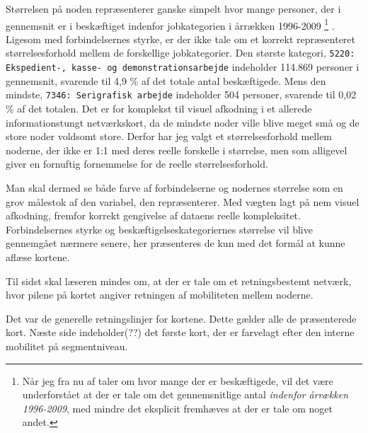 Størrelsen på noden repræsenterer ganske simpelt hvor mange personer, der i gennemsnit er i beskæftiget indenfor jobkategorien i årrækken 1996-2009%
%
\footnote{Når jeg fra nu af taler om hvor mange der er beskæftigede, vil det være underforstået at der er tale om det gennemsnitlige antal \emph{indenfor årrækken 1996-2009}, med mindre det eksplicit fremhæves at der er tale om noget andet.}%
%
. Ligesom med forbindelsernes styrke, er der ikke tale om et korrekt repræsenteret størrelsesforhold mellem de forskellige jobkategorier. Den største kategori, \texttt{5220: Ekspedient-, kasse- og demonstrationsarbejde} indeholder 114.869 personer i gennemsnit, svarende til 4,9 \% af det totale antal beskæftigede. Mens den mindste, \texttt{7346: Serigrafisk arbejde} indeholder 504 personer, svarende til 0,02 \% af det totalen. Det er for komplekst til visuel afkodning i et allerede informationstungt netværkskort, da de mindste noder ville blive meget små og de store noder voldsomt store. Derfor har jeg valgt et størrelsesforhold mellem noderne, der ikke er 1:1 med deres reelle forskelle i størrelse, men som alligevel giver en fornuftig fornemmelse for de reelle størrelsesforhold.  

Man skal dermed se både farve af forbindelserne og nodernes størrelse som en grov målestok af den variabel, den repræsenterer. Med vægten lagt på nem visuel afkodning, fremfor korrekt gengivelse af dataens reelle kompleksitet. Forbindelsernes styrke og beskæftigelseskategoriernes størrelse vil blive gennemgået nærmere senere, her præsenteres de kun med det formål at kunne aflæse kortene.  

Til sidst skal læseren mindes om, at der er tale om et retningsbestemt netværk, hvor pilene på kortet angiver retningen af mobiliteten mellem noderne. 

Det var de generelle retningslinjer for kortene. Dette gælder alle de præsenterede kort. Næste side indeholder(??) det første kort, der er farvelagt efter den interne mobilitet på segmentniveau.


